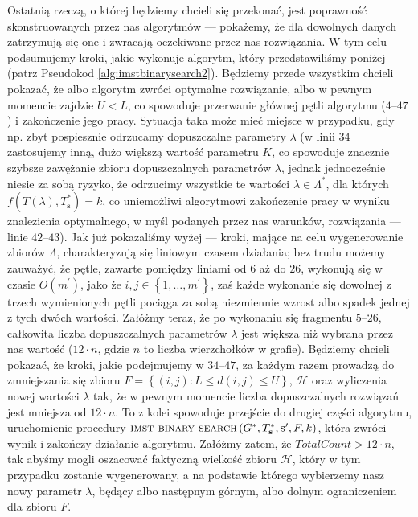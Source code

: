 Ostatnią rzeczą, o której będziemy chcieli się przekonać, jest poprawność skonstruowanych przez nas algorytmów --- pokażemy, że dla dowolnych danych zatrzymują się one i zwracają oczekiwane przez nas rozwiązania. W tym celu podsumujemy kroki, jakie wykonuje algorytm, który przedstawiliśmy poniżej (patrz Pseudokod \ref{alg:imstbinarysearch2}). Będziemy przede wszystkim chcieli pokazać, że albo algorytm zwróci optymalne rozwiązanie, albo w pewnym momencie zajdzie $U < L$, co spowoduje przerwanie głównej pętli algorytmu ($4$--$47$) i zakończenie jego pracy. Sytuacja taka może mieć miejsce w przypadku, gdy np. zbyt pospiesznie odrzucamy dopuszczalne parametry $\lambda$ (w linii $34$ zastosujemy inną, dużo większą wartość parametru $K$, co spowoduje znacznie szybsze zawężanie zbioru dopuszczalnych parametrów $\lambda$, jednak jednocześnie niesie za sobą ryzyko, że odrzucimy wszystkie te wartości $\lambda \in \Lambda^{\ast}$, dla których $f \left( T \left( \lambda \right), T^{\ast}_{\textbf{s}} \right) = k$, co uniemożliwi algorytmowi zakończenie pracy w wyniku znalezienia optymalnego, w myśl podanych przez nas warunków, rozwiązania --- linie $42$--$43$). Jak już pokazaliśmy wyżej --- kroki, mające na celu wygenerowanie zbiorów $\Lambda$, charakteryzują się liniowym czasem działania; bez trudu możemy zauważyć, że pętle, zawarte pomiędzy liniami od $6$ aż do $26$, wykonują się w czasie $O \left( m^{\prime} \right)$, jako że $i, j \in \left\{ 1, \dots, m^{\prime} \right\}$, zaś każde wykonanie się dowolnej z trzech wymienionych pętli pociąga za sobą niezmiennie wzrost albo spadek jednej z tych dwóch wartości. Załóżmy teraz, że po wykonaniu się fragmentu $5$--$26$, całkowita liczba dopuszczalnych parametrów $\lambda$ jest większa niż wybrana przez nas wartość ($12 \cdot n$, gdzie $n$ to liczba wierzchołków w grafie). Będziemy chcieli pokazać, że kroki, jakie podejmujemy w $34$--$47$, za każdym razem prowadzą do zmniejszania się zbioru $F = \left\{ \left( i, j \right) : L \leqslant d \left( i, j \right) \leqslant U \right\}$, $\mathcal{H}$ oraz wyliczenia nowej wartości $\lambda$ tak, że w pewnym momencie liczba dopuszczalnych rozwiązań jest mniejsza od $12 \cdot n$. To z kolei spowoduje przejście do drugiej części algorytmu, uruchomienie procedury $\textsc{imst-binary-search} \left( G^{\ast}, T^{\ast}_{\textbf{s}}, \textbf{s}^{\prime}, F, k \right)$, która zwróci wynik i zakończy działanie algorytmu. Załóżmy zatem, że $TotalCount > 12 \cdot n$, tak abyśmy mogli oszacować faktyczną wielkość zbioru $\mathcal{H}$, który w tym przypadku zostanie wygenerowany, a na podstawie którego wybierzemy nasz nowy parametr $\lambda$, będący albo następnym górnym, albo dolnym ograniczeniem dla zbioru $F$.

